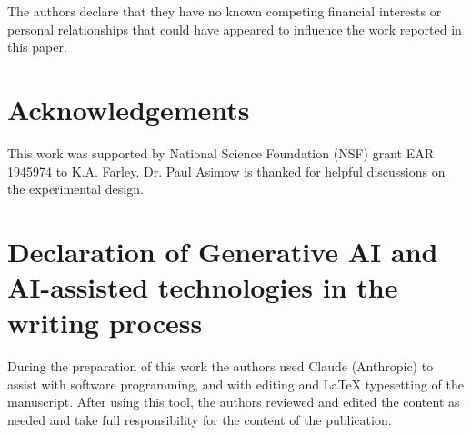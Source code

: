 The authors declare that they have no known competing financial interests or personal relationships that could have appeared to influence the work reported in this paper.

\section*{Acknowledgements}

This work was supported by National Science Foundation (NSF) grant EAR 1945974 to K.A. Farley. Dr. Paul Asimow is thanked for helpful discussions on the experimental design.

\section*{Declaration of Generative AI and AI-assisted technologies in the writing process}

During the preparation of this work the authors used Claude (Anthropic) to assist with software programming, and with editing and LaTeX typesetting of the manuscript. After using this tool, the authors reviewed and edited the content as needed and take full responsibility for the content of the publication.
